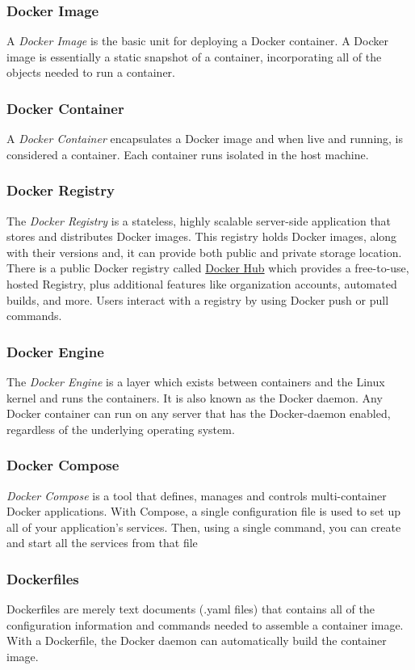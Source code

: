 \documentclass[12pt]{article}
\begin{document}
\subsubsection{Docker Image}
A \textit{Docker Image} is the basic unit for deploying a Docker container. A Docker image is essentially a static snapshot of a container, incorporating all of the objects needed to run a container.
\subsubsection{Docker Container}
A \textit{Docker Container} encapsulates a Docker image and when live and running, is considered a container. Each container runs isolated in the host machine.
\subsubsection{Docker Registry}
The \textit{Docker Registry} is a stateless, highly scalable server-side application that stores and distributes Docker images. This registry holds Docker images, along with their versions and, it can provide both public and private storage location. There is a public Docker registry called \href{https://hub.docker.com/}{Docker Hub} which provides a free-to-use, hosted Registry, plus additional features like organization accounts, automated builds, and more. Users interact with a registry by using Docker push or pull commands.
\subsubsection{Docker Engine}
The \textit{Docker Engine} is a layer which exists between containers and the Linux kernel and runs the containers. It is also known as the Docker daemon. Any Docker container can run on any server that has the Docker-daemon enabled, regardless of the underlying operating system.
\subsubsection{Docker Compose}
\textit{Docker Compose} is a tool that defines, manages and controls multi-container Docker applications. With Compose, a single configuration file is used to set up all of your application’s services. Then, using a single command, you can create and start all the services from that file
\subsubsection{Dockerfiles}
Dockerfiles are merely text documents (.yaml files) that contains all of the configuration information and commands needed to assemble a container image. With a Dockerfile, the Docker daemon can automatically build the container image.
\end{document}

